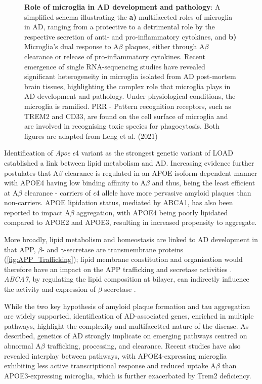 \begin{figure}[!htp]
	{\textbf{Role of microglia in AD development and pathology}: A simplified schema illustrating the \textbf{a)} multifaceted roles of microglia in AD, ranging from a protective to a detrimental role by the respective secretion of anti- and pro-inflammatory cytokines, and \textbf{b)} Microglia's dual response to A$\beta$ plaques, either through A$\beta$ clearance or release of pro-inflammatory cytokines. Recent emergence of single RNA-sequencing studies have revealed significant heterogeneity in microglia isolated from AD post-mortem brain tissues, highlighting the complex role that microglia plays in AD development and pathology. Under physiological conditions, the microglia is ramified. PRR - Pattern recognition receptors, such as TREM2 and CD33, are found on the cell surface of microglia and are involved in recognising toxic species for phagocytosis. Both figures are adapted from Leng et al. (2021)\cite{Leng2021a}  
	}
	\label{fig:microglia_AD}
\end{figure}


\label{intro_lipid}
Identification of \textit{Apoe} $\epsilon$4 variant as the strongest genetic variant of LOAD established a link between lipid metabolism and AD. Increasing evidence further postulates that A$\beta$ clearance is regulated in an APOE isoform-dependent manner\cite{Castellano2011} with APOE4 having low binding affinity to A$\beta$ and thus, being the least efficient at A$\beta$ clearance\cite{RM2012} - carriers of $\epsilon$4 allele have more pervasive amyloid plaques than non-carriers\cite{DE1993,E2009}. APOE lipidation status, mediated by ABCA1\cite{R2010}, has also been reported to impact A$\beta$ aggregation, with APOE4 being poorly lipidated compared to APOE2 and APOE3, resulting in increased propensity to aggregate\cite{DM2006}. 

More broadly, lipid metabolism and homeostasis are linked to AD development in that APP, $\beta$- and $\gamma$-secretase are transmembrane proteins (\cref{fig:APP_Trafficking}); lipid membrane constitution and organisation would therefore have an impact on the APP trafficking and secretase activities \cite{DiPaolo2011}. \textit{ABCA7}, by regulating the lipid composition at bilayer, can indirectly influence the activity and expression of $\beta$-secretase \cite{Sierksma2020,Sakae2016}.  


While the two key hypothesis of amyloid plaque formation and tau aggregation are widely supported, identification of AD-associated genes, enriched in multiple pathways, highlight the complexity and multifacetted nature of the disease. As described, genetics of AD strongly implicate on emerging pathways centred on abnormal A$\beta$ trafficking, processing, and clearance. Recent studies have also revealed interplay between pathways, with APOE4-expressing microglia exhibiting less active transcriptional response and reduced uptake A$\beta$ than APOE3-expressing microglia, which is further exacerbated by Trem2 deficiency\cite{Fitz2021}.  


